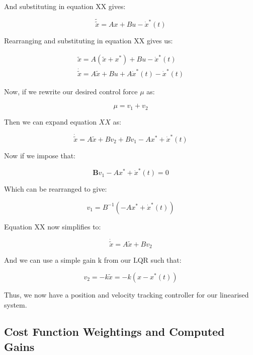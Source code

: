 \documentclass{UoNMCHA}
\numberwithin{equation}{section}
\begin{document}
	And substituting in equation XX gives:
	
	\begin{equation}
	\tilde{\tilde{x}}=A x+B u-\dot{x}^{*}(t)
	\end{equation}

	Rearranging and substituting in equation XX gives us:
	
	\begin{align}
	\tilde{x}=A\left(\tilde{x}+x^{*}\right)+B u-\dot{x}^{*}(t) \\
		\dot{\tilde{x}}=A \tilde{x}+B u+A \dot{x}^{*}(t)-\dot{x}^{*}(t)
	\end{align}

	Now, if we rewrite our desired control force $\mu$ as:
	
	\begin{equation}
	\mu=v_{1}+v_{2}
	\end{equation}
	
	Then we can expand equation $X X$ as:
	
	\begin{equation}
	\dot{\tilde{x}}=A \tilde{x}+B v_{2}+B v_{1}-A x^{*}+\dot{x}^{*}(t)
	\end{equation}

	\newpage
	
	Now if we impose that:
	
	\begin{equation}
	\boldsymbol{B} v_{1}-A x^{*}+\dot{x}^{*}(t)=0
	\end{equation}
	
	Which can be rearranged to give:
	
	\begin{equation}
	v_{1}=B^{-1}\left(-A x^{*}+\dot{x}^{*}(t)\right)
	\end{equation}
	
	Equation XX now simplifies to:
	
	\begin{equation}
	\dot{\tilde{x}}=A \tilde{x}+B v_{2}
	\end{equation}
	
	And we can use a simple gain $\mathrm{k}$ from our $\mathrm{LQR}$ such that:
	
	\begin{equation}
	v_{2}=-k \tilde{x}=-k\left(x-x^{*}(t)\right)
	\end{equation}
		
	Thus, we now have a position and velocity tracking controller for our linearised system.
	
	\subsection{Cost Function Weightings and Computed Gains}
	
\end{document}
